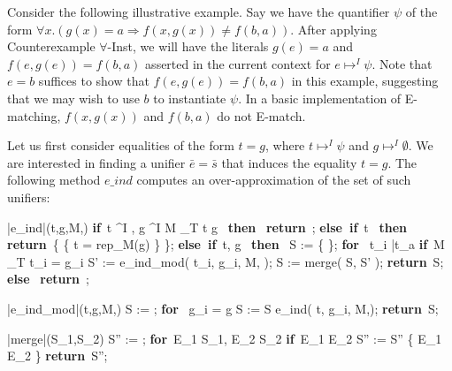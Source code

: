 \documentclass{llncs}
\def\IF{\qtab\keyword{if}\ }
\def\THEN{\ \keyword{then}\ }
\def\ELSE{\untab\qtab\keyword{else}\ }
\def\ELSEIF{\untab\qtab\keyword{else if}\ }
\def\FI{\untab}
\def\RETURN{\keyword{return}\ }
\def\ENDPROC{\untab}
\def\DOFOR{\qtab\keyword{for}\ }
\def\ENDFOR{\untab}
\def\keyword#1{\mbox{\normalshape\bf #1}}
\begin{document}
Consider the following illustrative example.
Say we have the quantifier $\psi$ of the form $\forall x. (g(x) = a \Rightarrow f( x, g( x ) ) \neq f( b, a ))$.
After applying Counterexample $\forall$-Inst, we will have the literals $g(e) = a$ and $f( e, g( e ) ) = f( b, a )$ asserted in the current context for $e \mapsto^I \psi$.
Note that $e = b$ suffices to show that $f( e, g( e ) ) = f( b, a )$ in this example, suggesting that we may wish to use $b$ to instantiate $\psi$.
In a basic implementation of E-matching, $f( x, g( x ) )$ and $f( b, a )$ do not E-match.

Let us first consider equalities of the form $t = g$, where $t \mapsto^I \psi$ and $g \mapsto^I \emptyset$.
We are interested in finding a unifier $\bar{e} = \bar{s}$ that induces the equality $t = g$.
The following method $e\_ind$ computes an over-approximation of the set of such unifiers:

\begin{minipage}[t]{.4\linewidth}
\begin{program}
\PROC |e\_ind|(t,g,M,\psi) \BODY
  \IF t \not\mapsto^I \psi, g \not\mapsto^I \emptyset {} M \models_T t \neq g \THEN
    \RETURN \emptyset;
  \ELSEIF t  \THEN
    \RETURN \{ \{ t = rep_M(g) \} \};
  \ELSEIF t, g  \THEN
    S := \{ \emptyset \};
    \DOFOR {} t_i  \bar{t_a} 
      \IF M \not\models_T t_i = g_i
        S' := e\_ind\_mod( t_i, g_i, M, \psi );
        S := merge( S, S' );
      \FI
    \ENDFOR
    \RETURN S;
  \ELSE
    \RETURN \emptyset;
  \FI
\ENDPROC
\end{program}
\end{minipage}
\begin{minipage}[t]{.4\linewidth}
\begin{program}
\PROC |e\_ind\_mod|(t,g,M,\psi) \BODY
  S := \emptyset;
  \DOFOR {} g_i = g
    S := S \cup e\_ind( t, g_i, M,\psi );
  \ENDFOR
  \RETURN S;
\ENDPROC
\end{program}
\begin{program}
\PROC |merge|(S_1,S_2) \BODY
  S'' := \emptyset;
  \DOFOR E_1 \in S_1, E_2 \in S_2
    \IF E_1  E_2 
      S'' := S'' \cup \{ E_1 \cup E_2 \}
    \FI
  \ENDFOR
  \RETURN S'';
\ENDPROC
\end{program}
\end{minipage}
\end{document}

